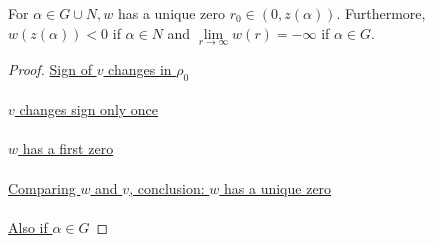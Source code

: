 \begin{lemma}\label{wq}For $\alpha\in G\cup N,w$ has a unique zero $r_0\in(0,z(\alpha)).$ Furthermore, $w(z(\alpha))<0$ if $\alpha\in N$ and $\underset{r\to\infty}{\lim}w(r)=-\infty$ if $\alpha\in G$.
\begin{proof} 
\underline{Sign of $v$ changes in $\rho_0$} \\ \\ \underline{$v$ changes sign only once} \\ \\  \underline{$w$ has a first zero} \\ \\ \underline{Comparing $w$ and $v$, conclusion: $w$ has a unique zero} \\ \\ \underline{Also if $\alpha\in G$}
\end{proof} 
\end{lemma}
